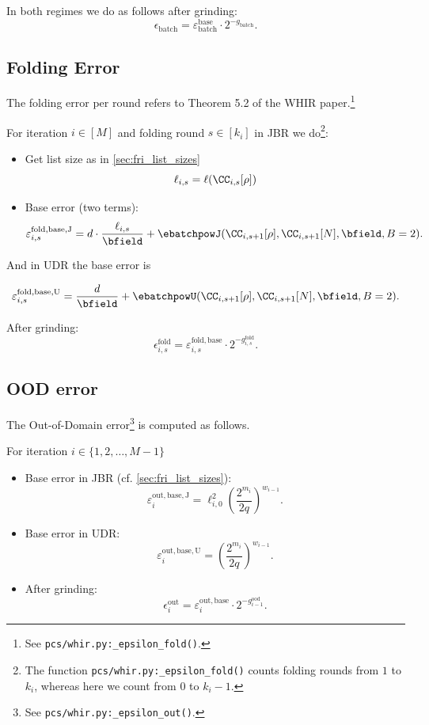 In both regimes we do as follows after grinding:
\[
  \epsilon_{\mathrm{batch}}
  = \varepsilon_{\mathrm{batch}}^{\text{base}}
    \cdot 2^{-g_{\mathrm{batch}}}.
\]
\subsection{Folding Error}

The folding error per round refers to Theorem 5.2 of the WHIR paper.\footnote{See \texttt{pcs/whir.py:\_epsilon\_fold()}.}

For iteration \(i\in[M]\) and folding round \(s\in[k_i]\) in JBR we do\footnote{The function \texttt{pcs/whir.py:\_epsilon\_fold()}
counts folding rounds from \(1\) to \(k_i\), whereas here we count from \(0\) to \(k_i-1\).    }:
\begin{itemize}
    \item %
    Get list size as in \cref{sec:fri_list_sizes}
    $$
    \ell_{i,s} =\ell(\CC_{i,s}[\rho])
    $$
    \item
Base error (two terms):
\[
  \varepsilon^{\mathrm{fold,base,J}}_{i,s}
    = d \cdot \frac{\ell_{i,s}}{\bfield}
      + \ebatchpowJ(\CC_{i,s+1}[\rho],\CC_{i,s+1}[N],\bfield,B=2).
\]
\end{itemize} And in UDR the base error is

\[
  \varepsilon^{\mathrm{fold,base,U}}_{i,s}
    =  \frac{d}{\bfield}
      + \ebatchpowU(\CC_{i,s+1}[\rho],\CC_{i,s+1}[N],\bfield,B=2).
\]

After grinding:
\[
  \epsilon^{\mathrm{fold}}_{i,s}
    = \varepsilon^{\mathrm{fold,base}}_{i,s}
      \cdot 2^{-g^{\mathrm{fold}}_{i,s}}.
\]

\subsection{OOD error }

The Out-of-Domain error\footnote{See \texttt{pcs/whir.py:\_epsilon\_out()}.} is computed as follows.

For iteration \(i\in\{1,2,\ldots,M-1\}\)
\begin{itemize}
    \item
Base error in JBR (cf. \cref{sec:fri_list_sizes}):
\[
  \varepsilon^{\mathrm{out,base,J}}_i
  = \ell_{i,0}^2
    \left(\frac{2^{m_i}}{2q}\right)^{w_{i-1}}.
\]
\item Base error in UDR:
\[
  \varepsilon^{\mathrm{out,base,U}}_i
  =  \left(\frac{2^{m_i}}{2q}\right)^{w_{i-1}}.
\]
\item After grinding:
\[
  \epsilon^{\mathrm{out}}_i
  = \varepsilon^{\mathrm{out,base}}_i
    \cdot 2^{-g^{\mathrm{ood}}_{i-1}}.
\]

\end{itemize}
